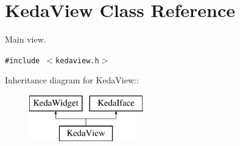 \section{Keda\-View Class Reference}
\label{classKedaView}
Main view.  


{\tt \#include $<$kedaview.h$>$}

Inheritance diagram for Keda\-View::\begin{figure}[H]
\begin{center}
\leavevmode
\includegraphics[height=2cm]{classKedaView}
\end{center}
\end{figure}

